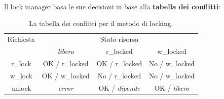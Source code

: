 \documentclass[a4paper]{article}
\begin{document}
	\noindent
	Il lock manager basa le sue decisioni in base alla \textbf{tabella dei conflitti}:
	\begin{table}[!htbp]
		\centering
		\begin{tabular}{@{} c c c c @{}}
			\toprule
			Richiesta 	& 			& Stato risorsa	& \\ \cmidrule{2-4}
						& \emph{libero} 	& \textsf{r\_locked} 	& \textsf{w\_locked} \\
			\midrule
			\textsf{r\_lock}& OK / \textsf{r\_locked}	& OK / \textsf{r\_locked}	& No / \textsf{w\_locked} 	\\
			\textsf{w\_lock}& OK / \textsf{w\_locked}	& No / \textsf{r\_locked}	& No / \textsf{w\_locked}	\\
			\textsf{unlock}	& \emph{error}				& OK / \emph{dipende}		& OK / \emph{libero}		\\
			\bottomrule
		\end{tabular}
		\caption{La tabella dei conflitti per il metodo di locking.}
	\end{table}
\end{document}
